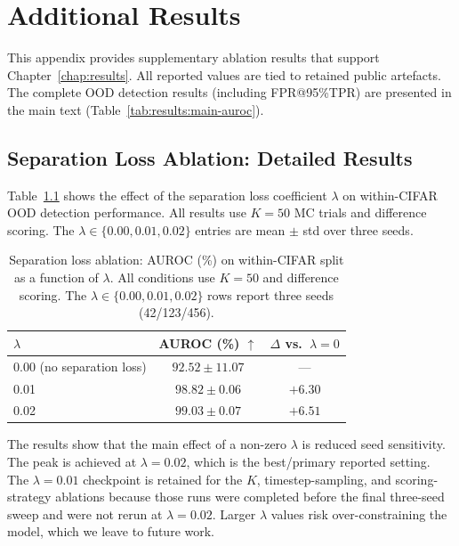 \chapter{Additional Results}
\label{app:additional-results}

This appendix provides supplementary ablation results that support Chapter~\ref{chap:results}. All reported values are tied to retained public artefacts. The complete OOD detection results (including FPR@95\%TPR) are presented in the main text (Table~\ref{tab:results:main-auroc}).

\section{Separation Loss Ablation: Detailed Results}
\label{app:additional-results:separation}

Table~\ref{tab:appD:lambda-ablation} shows the effect of the separation loss coefficient $\lambda$ on within-CIFAR OOD detection performance. All results use $K{=}50$ MC trials and difference scoring. The $\lambda \in \{0.00, 0.01, 0.02\}$ entries are mean $\pm$ std over three seeds.

\begin{table}[htbp]
  \centering
  \caption{Separation loss ablation: AUROC (\%) on within-CIFAR split as a function of $\lambda$. All conditions use $K{=}50$ and difference scoring. The $\lambda \in \{0.00, 0.01, 0.02\}$ rows report three seeds (42/123/456).}
  \label{tab:appD:lambda-ablation}
  \begin{tabular}{lcc}
    \toprule
    $\lambda$ & AUROC (\%) $\uparrow$ & $\Delta$ vs.\ $\lambda{=}0$ \\
    \midrule
    0.00 (no separation loss) & $92.52 \pm 11.07$ & --- \\
    0.01 & $98.82 \pm 0.06$ & $+6.30$ \\
    0.02 & $99.03 \pm 0.07$ & $+6.51$ \\
    \bottomrule
  \end{tabular}
\end{table}

The results show that the main effect of a non-zero $\lambda$ is reduced seed sensitivity. The peak is achieved at $\lambda{=}0.02$, which is the best/primary reported setting. The $\lambda{=}0.01$ checkpoint is retained for the $K$, timestep-sampling, and scoring-strategy ablations because those runs were completed before the final three-seed sweep and were not rerun at $\lambda{=}0.02$. Larger $\lambda$ values risk over-constraining the model, which we leave to future work.


